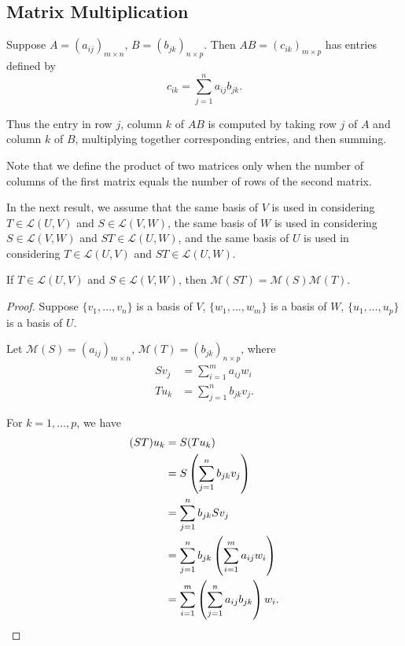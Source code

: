 \subsection{Matrix Multiplication}
\begin{definition}
Suppose $A=(a_{ij})_{m\times n}$, $B=(b_{jk})_{n\times p}$. Then $AB=(c_{ik})_{m\times p}$ has entries defined by
\[c_{ik}=\sum_{j=1}^{n}a_{ij}b_{jk}.\]
\end{definition}

\begin{remark}
Thus the entry in row $j$, column $k$ of $AB$ is computed by taking row $j$ of $A$ and column $k$ of $B$, multiplying together corresponding entries, and then summing.
\end{remark}

\begin{remark}
Note that we define the product of two matrices only when the number of columns of the first matrix equals the number of rows of the second matrix.
\end{remark}

In the next result, we assume that the same basis of $V$ is used in considering $T\in\mathcal{L}(U,V)$ and $S\in\mathcal{L}(V,W)$, the same basis of $W$ is used in considering $S\in\mathcal{L}(V,W)$ and $ST\in\mathcal{L}(U,W)$, and the same basis of $U$ is used in considering $T\in\mathcal{L}(U,V)$ and $ST\in\mathcal{L}(U,W)$.

\begin{proposition}
If $T\in\mathcal{L}(U,V)$ and $S\in\mathcal{L}(V,W)$, then $\mathcal{M}(ST)=\mathcal{M}(S)\mathcal{M}(T)$.
\end{proposition}

\begin{proof}
Suppose $\{v_1,\dots,v_n\}$ is a basis of $V$, $\{w_1,\dots,w_m\}$ is a basis of $W$, $\{u_1,\dots,u_p\}$ is a basis of $U$.

Let $\mathcal{M}(S)=(a_{ij})_{m\times n}$, $\mathcal{M}(T)=(b_{jk})_{n\times p}$, where
\begin{align*}
Sv_j&=\sum_{i=1}^{m}a_{ij}w_i\\
Tu_k&=\sum_{j=1}^{n}b_{jk}v_j.
\end{align*}

For $k=1,\dots,p$, we have
\begin{align*}
(ST)u_k&=S(Tu_k)\\
&=S\left(\sum_{j=1}^{n}b_{jk}v_j\right)\\
&=\sum_{j=1}^{n}b_{jk}Sv_j\\
&=\sum_{j=1}^{n}b_{jk}\left(\sum_{i=1}^{m}a_{ij}w_i\right)\\
&=\sum_{i=1}^{m}\left(\sum_{j=1}^{n}a_{ij}b_{jk}\right)w_i.
\end{align*}
\end{proof}

